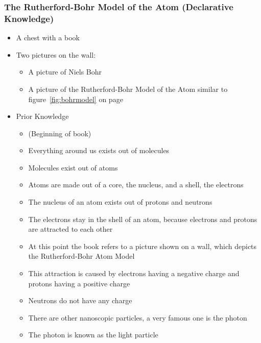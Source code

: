 \documentclass[11pt,twoside]{report} %
\begin{document}
\subsubsection{The Rutherford-Bohr Model of the Atom (Declarative Knowledge)}
\begin{itemize}
	\item A chest with a book
	\item Two pictures on the wall:
	\begin{itemize}
		\item A picture of Niels Bohr
		\item A picture of the Rutherford-Bohr Model of the Atom similar to figure~\ref{fig:bohrmodel} on page~\pageref{fig:bohrmodel}
	\end{itemize}
	\item Prior Knowledge
	\begin{itemize}
		\item (Beginning of book)
		\item Everything around us exists out of molecules
		\item Molecules exist out of atoms
		\item Atoms are made out of a core, the nucleus, and a shell, the electrons
		\item The nucleus of an atom exists out of protons and neutrons
		\item The electrons stay in the shell of an atom, because electrons and protons are attracted to each other
		\item At this point the book refers to a picture shown on a wall, which depicts the Rutherford-Bohr Atom Model
		\item This attraction is caused by electrons having a negative charge and protons having a positive charge
		\item Neutrons do not have any charge
		\item There are other nanoscopic particles, a very famous one is the photon
		\item The photon is known as the light particle
	\end{itemize}
\end{itemize}
\end{document}
